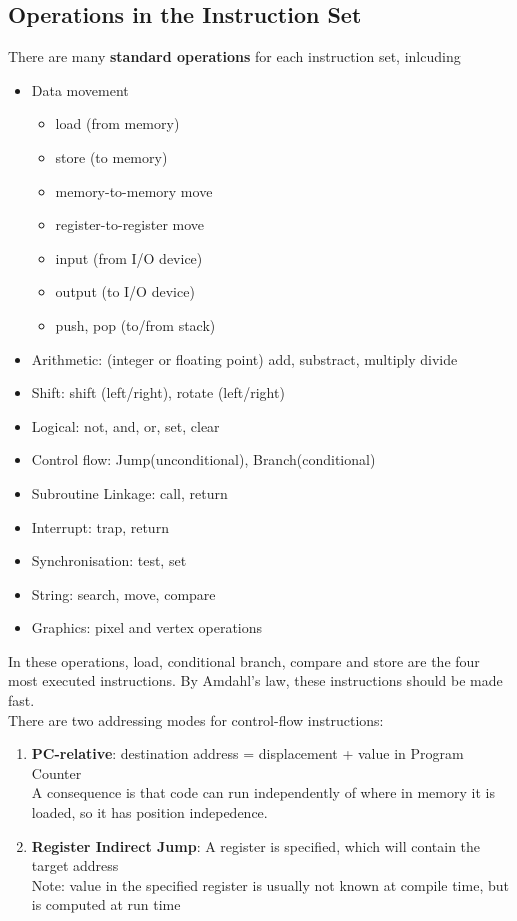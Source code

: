 \documentclass[12pt]{article}
\theoremstyle{definition}
\begin{document}
\subsection{Operations in the Instruction Set}
There are many \textbf{standard operations} for each instruction set, inlcuding 
\begin{itemize}
  \item Data movement
  \begin{itemize}
    \item load (from memory)
    \item store (to memory)
    \item memory-to-memory move
    \item register-to-register move
    \item input (from I/O device)
    \item output (to I/O device)
    \item push, pop (to/from stack)
  \end{itemize}
  \item Arithmetic: (integer or floating point) add, substract, multiply divide
  \item Shift: shift (left/right), rotate (left/right)
  \item Logical: not, and, or, set, clear
  \item Control flow: Jump(unconditional), Branch(conditional)
  \item Subroutine Linkage: call, return
  \item Interrupt: trap, return
  \item Synchronisation: test, set
  \item String: search, move, compare
  \item Graphics: pixel and vertex operations
\end{itemize}
In these operations, load, conditional branch, compare and store are the four most executed instructions. By Amdahl's law, these instructions should be made fast.\\There are two addressing modes for control-flow instructions:
\begin{enumerate}
  \item \textbf{PC-relative}: destination address = displacement + value in Program Counter\\A consequence is that code can run independently of where in memory it is loaded, so it has position indepedence.
  \item \textbf{Register Indirect Jump}: A register is specified, which will contain the target address\\Note: value in the specified register is usually not known at compile time, but is computed at run time
\end{enumerate}
\end{document}
